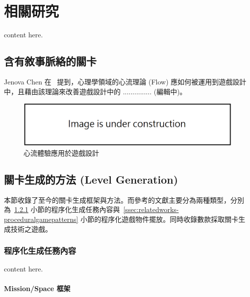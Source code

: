 \chapter{相關研究}
\label{cha:relatedworks}

content here.

\section{含有敘事脈絡的關卡}
\label{sec:flow-in-games}

Jenova Chen 在~\cite{chen2007flow} 提到，心理學領域的心流理論 (Flow) 應如何被運用到遊戲設計中，且藉由該理論來改善遊戲設計中的 ............... (編輯中)。

\begin{figure}[ht]
  \begin{center}
    \includegraphics[width=1.0\textwidth]{figures/under_construction.png}
    \caption{心流體驗應用於遊戲設計} 
    \label{fig:flow-in-games}
  \end{center}
\end{figure}

\section{關卡生成的方法 (Level Generation)}
\label{sec:relatedworks-levelgeneration}

本節收錄了至今的關卡生成框架與方法。而參考的文獻主要分為兩種類型，分別為~\ref{ssec:relatedworks-proceduralmission} 小節的程序化生成任務內容與~\ref{ssec:relatedworks-proceduralgamepatterns} 小節的程序化遊戲物件擺放。同時收錄數款採取關卡生成技術之遊戲。

\subsection{程序化生成任務內容}
\label{ssec:relatedworks-proceduralmission}

content here.

\subsubsection{Mission/Space 框架}
\label{sssec:relatedworks-proceduralmission-missionspace}

